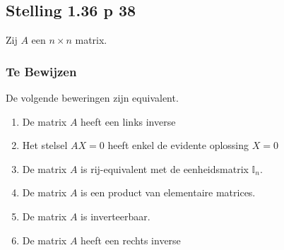 \documentclass[lineaire_algebra_oplossingen.tex]{subfiles}
\begin{document}
\subsection{Stelling 1.36 p 38}
\label{1.36}
Zij $A$ een $n\times n$ matrix.

\subsubsection*{Te Bewijzen}
De volgende beweringen zijn equivalent.
\begin{enumerate}
\item De matrix $A$ heeft een links inverse
\item Het stelsel $AX = 0$ heeft enkel de evidente oplossing $X=0$
\item De matrix $A$ is rij-equivalent met de eenheidsmatrix $\mathbb{I}_n$.
\item De matrix $A$ is een product van elementaire matrices.
\item De matrix $A$ is inverteerbaar.
\item De matrix $A$ heeft een rechts inverse
\end{enumerate}
\end{document}
